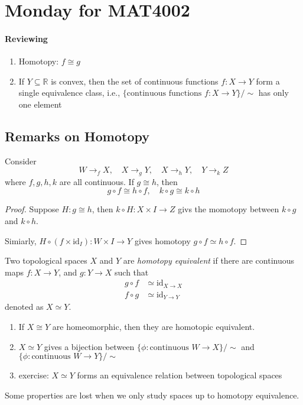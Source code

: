 \section{Monday for MAT4002}
\paragraph{Reviewing}
\begin{enumerate}
\item
Homotopy: $f\cong g$
\item
If $Y\subseteq\mathbb{R}$ is convex, then the set of continuous functions $f:X\to Y$ form a single equivalence class, i.e., $\{\text{continuous functions $f:X\to Y$}\}/\sim$ has only one element
\end{enumerate}
\subsection{Remarks on Homotopy}
\begin{proposition}
Consider
\[
W\to_fX,\quad
X\to_gY,\quad
X\to_hY,\quad
Y\to_k Z
\]
where $f,g,h,k$ are all continuous. If $g\cong h$, then
\[
g\circ f\cong h\circ f,\quad
k\circ g\cong k\circ h
\]
\end{proposition}
\begin{proof}
Suppose $H:g\cong h$, then $k\circ H:X\times I\to Z$ givs the momotopy between $k\circ g$ and $k\circ h$.

Simiarly, $H\circ(f\times\text{id}_I):W\times I\to Y$ gives homotopy $g\circ f\simeq h\circ f$.

\end{proof}

\begin{definition}
Two topological spaces $X$ and $Y$ are \emph{homotopy equivalent} if there are continuous maps $f:X\to Y$, and $g:Y\to X$ such that
\begin{align*}
g\circ f&\simeq \text{id}_{X\to X}\\
f\circ g&\simeq\text{id}_{Y\to Y}
\end{align*}
denoted as $X\simeq Y$.
\end{definition}
\begin{remark}
\begin{enumerate}
\item
If $X\cong Y$ are homeomorphic, then they are homotopic equivalent.
\item
$X\simeq Y$ gives a bijection between $\{\phi:\text{continuous }W\to X\}/\sim$ and $\{\phi:\text{continuous }W\to Y\}/\sim$
\item
exercise: $X\simeq Y$ forms an equivalence relation between topological spaces
\end{enumerate}
\end{remark}
Some properties are lost when we only study spaces up to homotopy equivalence.

